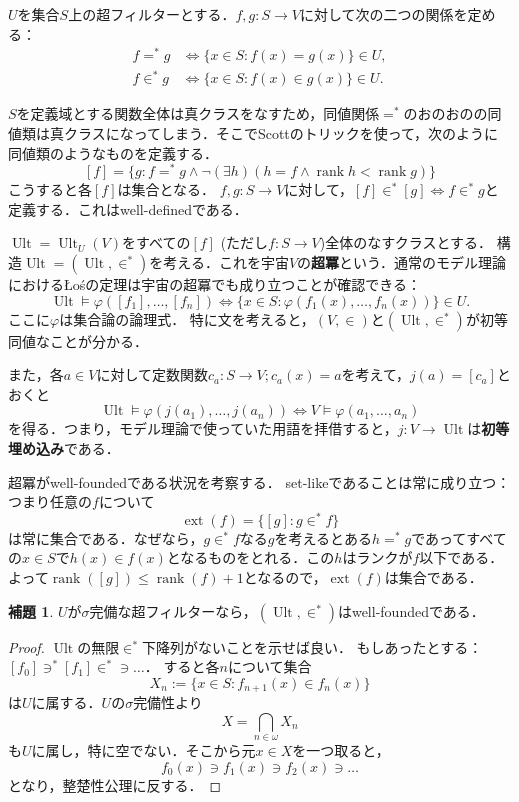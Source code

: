 \documentclass[uplatex]{jsarticle}
\newcommand{\rank}{\operatorname{rank}}
\newcommand{\Ult}{\operatorname{Ult}}
\newcommand{\ext}{\operatorname{ext}}
\theoremstyle{definition}
\newtheorem{lem}[thm]{補題}
\begin{document}
	$U$を集合$S$上の超フィルターとする．$f, g \colon S \to V$に対して次の二つの関係を定める：
	\begin{align*}
		f =^* g &\iff \{ x \in S : f(x) = g(x) \} \in U, \\
		f \in^* g &\iff \{ x \in S : f(x) \in g(x) \} \in U.
	\end{align*}

	$S$を定義域とする関数全体は真クラスをなすため，同値関係$=^*$のおのおのの同値類は真クラスになってしまう．そこでScottのトリックを使って，次のように同値類のようなものを定義する．
	\[
	[f] = 	\{ g : f =^* g \land \neg (\exists h)(h = f \land \rank h < \rank g) \}
	\]
	こうすると各$[f]$は集合となる．
	$f, g \colon S \to V$に対して，$[f] \in^* [g] \iff f \in^* g$と定義する．これはwell-definedである．
	
	$\Ult = \Ult_U(V)$をすべての$[f]$ (ただし$f \colon S \to V$)全体のなすクラスとする．
	構造$\Ult = (\Ult, \in^*)$を考える．これを宇宙$V$の\textbf{超冪}という．通常のモデル理論におけるŁośの定理は宇宙の超冪でも成り立つことが確認できる：
	\[
	\Ult \models \varphi([f_1], \dots, [f_n]) \iff \{ x \in S : \varphi(f_1(x), \dots, f_n(x)) \} \in U.
	\]
	ここに$\varphi$は集合論の論理式．
	特に文を考えると，$(V, \in)$と$(\Ult, \in^*)$が初等同値なことが分かる．
	
	また，各$a \in V$に対して定数関数$c_a \colon S \to V; c_a(x) = a$を考えて，$j(a) = [c_a]$とおくと
	\[
	\Ult \models \varphi(j(a_1), \dots, j(a_n)) \iff V \models \varphi(a_1, \dots, a_n) 
	\]
	を得る．つまり，モデル理論で使っていた用語を拝借すると，$j \colon V \to \Ult$は\textbf{初等埋め込み}である．

	超冪がwell-foundedである状況を考察する．
	set-likeであることは常に成り立つ：つまり任意の$f$について
	\[
	\ext(f) = \{ [g] : g \in^* f \}
	\]
	は常に集合である．なぜなら，$g \in^* f$なる$g$を考えるとある$h =^* g$であってすべての$x \in S$で$h(x) \in f(x)$となるものをとれる．この$h$はランクが$f$以下である．よって$\rank([g]) \le \rank(f) + 1$となるので，$\ext(f)$は集合である．
	
	\begin{lem}
		$U$が$\sigma$完備な超フィルターなら，$(\Ult, \in^*)$はwell-foundedである．	
	\end{lem}
	\begin{proof}
		$\Ult$の無限$\in^*$下降列がないことを示せば良い．
		もしあったとする：$[f_0] \ni^* [f_1] \in^* \ni \dots$．
		すると各$n$について集合
		\[
			X_n := \{ x \in S : f_{n+1}(x) \in f_n(x) \}
		\]
		は$U$に属する．$U$の$\sigma$完備性より
		\[
			X = \bigcap_{n \in \omega} X_n
		\]
		も$U$に属し，特に空でない．そこから元$x \in X$を一つ取ると，
		\[
		f_0(x) \ni f_1(x) \ni f_2(x) \ni \dots
		\]
		となり，整楚性公理に反する．
	\end{proof}
	
\end{document}
